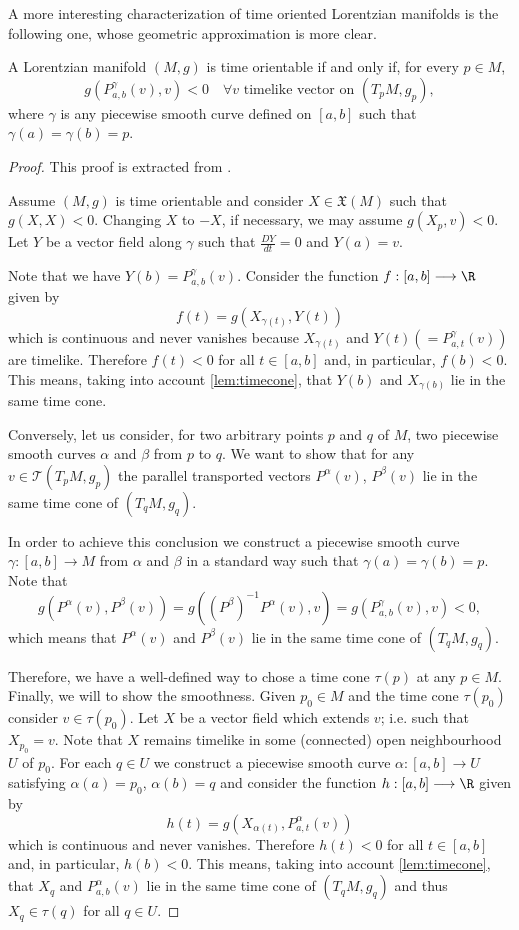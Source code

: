 A more interesting characterization of time oriented Lorentzian manifolds is the following one, whose geometric approximation is more clear.

\begin{corollary}
	\label{cor:timeorientable2}
	A Lorentzian manifold $(M,g)$ is time orientable if and only if, for every $p \in M$,
	\[
		g(P^\gamma_{a,b}(v), v) < 0 \quad \forall v \textrm{ timelike vector on } (T_pM, g_p),
	\]
	where $\gamma$ is any piecewise smooth curve defined on $[a,b]$ such that $\gamma(a) = \gamma(b) = p$.
\end{corollary}

\begin{proof}
	This proof is extracted from \cite[p. 202]{romero10}.
	
	Assume $(M,g)$ is time orientable and consider $X \in \mathfrak{X}(M)$ such that $g(X,X)<0$. Changing $X$ to $-X$, if necessary, we may assume $g(X_p,v)<0$. Let $Y$ be a vector field along $\gamma$ such that $\frac{DY}{dt}=0$ and $Y(a)=v$.
	
	Note that we have $Y(b)=P_{a,b}^{\gamma}(v)$. Consider the function $f : [a,b] \longrightarrow \R$ given by
	\[
		f(t)= g(X_{\gamma(t)},Y(t))
	\]
	which is continuous and never vanishes because $X_{\gamma(t)}$ and $Y(t)(=P_{a,t}^{\gamma}(v))$ are timelike. Therefore $f(t)<0$ for all $t\in [a,b]$ and, in particular, $f(b)<0$. This means, taking into account \autoref{lem:timecone}, that $Y(b)$ and $X_{\gamma(b)}$ lie in the same time cone.
	
	Conversely, let us consider, for two arbitrary points $p$ and $q$ of $M$, two piecewise smooth curves $\alpha$ and $\beta$ from $p$ to $q$. We want to show that for any $v\in \mathcal{T}(T_pM,g_p)$ the parallel transported vectors $P^{\alpha}(v)$, $P^{\beta}(v)$ lie in the same time cone of $(T_qM,g_q)$.
	
	In order to achieve this conclusion we construct a piecewise smooth curve $\gamma : [a,b] \longrightarrow M$ from $\alpha$ and $\beta$ in a standard way such that $\gamma(a)=\gamma(b)=p$. Note that $$g(P^{\alpha}(v),P^{\beta}(v))=g((P^{\beta})^{-1}P^{\alpha}(v),v)=g(P_{a,b}^{\gamma}(v),v)<0,$$ which means that $P^{\alpha}(v)$ and $P^{\beta}(v)$ lie in the same time cone of $(T_qM,g_q)$.
	
	Therefore, we have a well-defined way to chose a time cone $\tau(p)$ at any $p \in M$. Finally, we will to show the smoothness. Given $p_0 \in M$ and the time cone $\tau(p_0)$ consider $v \in \tau(p_0)$. Let $X$ be a vector field which extends $v$; i.e. such that $X_{p_{0}}=v$. Note that $X$ remains timelike in some (connected) open neighbourhood $U$ of $p_0$. For each $q \in U$ we construct a piecewise smooth curve $\alpha : [a,b] \longrightarrow U$ satisfying $\alpha(a)=p_0$,
	$\alpha(b)=q$ and consider the function $h : [a,b] \longrightarrow \R$ given by
	\[
		h(t)=g(X_{\alpha(t)},P_{a,t}^{\alpha}(v))
	\]
	which is continuous and never vanishes. Therefore $h(t)<0$ for all $t\in [a,b]$ and, in particular, $h(b)<0$. This means, taking into account \autoref{lem:timecone}, that $X_q$ and $P_{a,b}^{\alpha}(v)$ lie in the same time cone of $(T_qM,g_q)$ and thus $X_q \in \tau(q)$ for all $q \in U$.
\end{proof}


